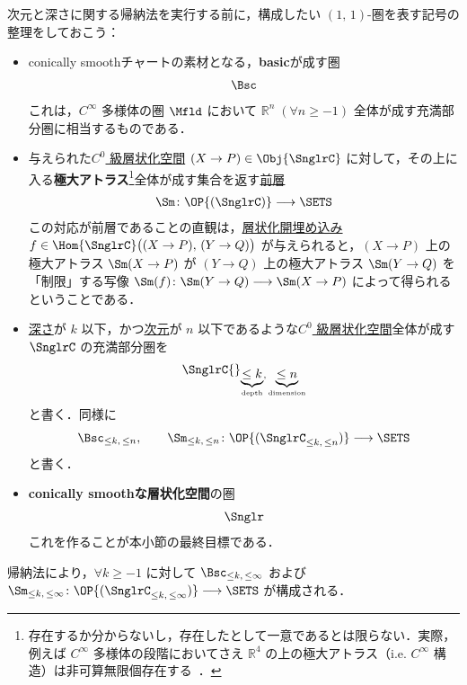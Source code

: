 \documentclass[TQFT_main]{subfiles}
\begin{document}
次元と深さに関する帰納法を実行する前に，構成したい $(1,\, 1)$-圏を表す記号の整理をしておこう：
\begin{itemize}
    \item conically smoothチャートの素材となる，\textbf{basic}が成す圏
    \begin{align}
        \Bsc    
    \end{align}
    これは，$C^\infty$ 多様体の圏 $\Mfld$ において $\mathbb{R}^n\; (\forall n \ge -1)$ 全体が成す充満部分圏に相当するものである．
    
    \item 与えられた\hyperref[def:Snglr-C0]{$C^0$ 級層状化空間} $(X \to P) \in \Obj{\SnglrC}$ に対して，その上に入る\textbf{極大アトラス}\footnote{存在するか分からないし，存在したとして一意であるとは限らない．実際，例えば $C^\infty$ 多様体の段階においてさえ $\mathbb{R}^4$ の上の極大アトラス（i.e. $C^\infty$ 構造）は非可算無限個存在する~\cite{taubes1987gauge}．}全体が成す集合を返す\hyperref[def:presheaf]{前層}
    \begin{align}
        \Sm \colon \OP{(\SnglrC)} \lto \SETS
    \end{align}
    この対応が前層であることの直観は，\hyperref[def:strat-emb]{層状化開埋め込み} $f \in \Hom{\SnglrC} \bigl((X \to P),\, (Y \to Q)\bigr)$ が与えられると，$(X \to P)$ 上の極大アトラス $\Sm(X \to P)$ が $(Y \to Q)$ 上の極大アトラス $\Sm(Y \to Q)$ を「制限」する写像 $\Sm(f) \colon \Sm(Y \to Q) \lto \Sm(X \to P)$ によって得られるということである．
    
    \item \hyperref[def:dim-depth]{深さ}が $k$ 以下，かつ\hyperref[def:dim-depth]{次元}が $n$ 以下であるような\hyperref[def:Snglr-C0]{$C^0$ 級層状化空間}全体が成す $\SnglrC$ の充満部分圏を
    \begin{align}
        \SnglrC{}_{\underbrace{\le k}_{\text{depth}},\, \underbrace{\le n}_{\text{dimension}}}
    \end{align}
    と書く．同様に
    \begin{align}
        \Bsc_{\le k,\, \le n},\qquad \Sm_{\le k,\, \le n} \colon \OP{(\SnglrC_{\le k,\, \le n})} \lto \SETS
    \end{align}
    と書く．
    
    \item \textbf{conically smoothな層状化空間}の圏
    \begin{align}
        \Snglr
    \end{align}
    これを作ることが本小節の最終目標である．
\end{itemize}
帰納法により，$\forall k \ge -1$ に対して $\Bsc_{\le k,\, \le \infty}$ および $\Sm_{\le k,\, \le \infty} \colon \OP{(\SnglrC_{\le k,\, \le \infty})} \lto \SETS$ が構成される．
\end{document}
